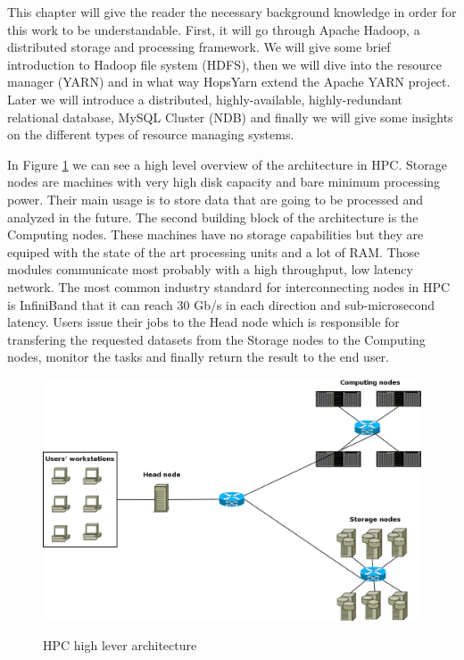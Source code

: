 This chapter will give the reader the necessary background knowledge
in order for this work to be understandable. First, it will go through
Apache Hadoop, a distributed storage and processing framework. We will
give some brief introduction to Hadoop file system (HDFS), then we
will dive into the
resource manager (YARN) and in what way HopsYarn extend the Apache
YARN project. Later we will introduce a distributed, highly-available,
highly-redundant relational database, MySQL Cluster (NDB) and finally
we will give some insights on the different types of resource managing
systems.

In Figure \ref{fig:back_hpc_arch_overview} we can see a high level
overview of the architecture in HPC. Storage nodes are machines with very high disk capacity and bare
minimum processing power. Their main usage is to store data that are
going to be processed and analyzed in the future. The second building
block of the architecture is the Computing nodes. These machines have
no storage capabilities but they are equiped with the state of the art
processing units and a lot of RAM. Those modules communicate most
probably with a high throughput, low latency network. The most common
industry standard for interconnecting nodes in HPC is InfiniBand
\cite{infiniband} that it can
reach 30 Gb/s in each direction and sub-microsecond latency. Users
issue their jobs to the Head node which is responsible for transfering
the requested datasets from the Storage nodes to the Computing nodes,
monitor the tasks and finally return the result to the end user.

\begin{figure}
\centering
\includegraphics[scale=0.3]{resources/images/Background/hpc_arch_overview.png}
\label{fig:back_hpc_arch_overview}
\caption{HPC high lever architecture}
\end{figure}

